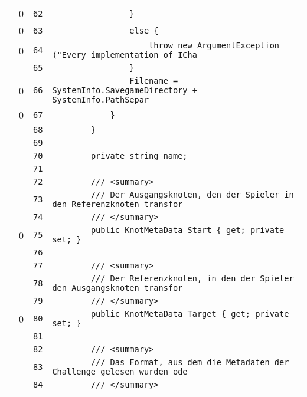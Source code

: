 \documentclass[a4paper,10pt]{article}
\begin{document}
\begin{longtable}[l]{lrrl}
\cellcolor{red} & 0 & \verb~62~ & \verb~                }~\\
\cellcolor{red} & 0 & \verb~63~ & \verb~                else {~\\
\cellcolor{red} & 0 & \verb~64~ & \verb~                    throw new ArgumentException ("Every implementation of ICha~\\
\cellcolor{gray} &  & \verb~65~ & \verb~                }~\\
\cellcolor{red} & 0 & \verb~66~ & \verb~                Filename = SystemInfo.SavegameDirectory + SystemInfo.PathSepar~\\
\cellcolor{red} & 0 & \verb~67~ & \verb~            }~\\
\cellcolor{gray} &  & \verb~68~ & \verb~        }~\\
\cellcolor{gray} &  & \verb~69~ & \verb~~\\
\cellcolor{gray} &  & \verb~70~ & \verb~        private string name;~\\
\cellcolor{gray} &  & \verb~71~ & \verb~~\\
\cellcolor{gray} &  & \verb~72~ & \verb~        /// <summary>~\\
\cellcolor{gray} &  & \verb~73~ & \verb~        /// Der Ausgangsknoten, den der Spieler in den Referenzknoten transfor~\\
\cellcolor{gray} &  & \verb~74~ & \verb~        /// </summary>~\\
\cellcolor{red} & 0 & \verb~75~ & \verb~        public KnotMetaData Start { get; private set; }~\\
\cellcolor{gray} &  & \verb~76~ & \verb~~\\
\cellcolor{gray} &  & \verb~77~ & \verb~        /// <summary>~\\
\cellcolor{gray} &  & \verb~78~ & \verb~        /// Der Referenzknoten, in den der Spieler den Ausgangsknoten transfor~\\
\cellcolor{gray} &  & \verb~79~ & \verb~        /// </summary>~\\
\cellcolor{red} & 0 & \verb~80~ & \verb~        public KnotMetaData Target { get; private set; }~\\
\cellcolor{gray} &  & \verb~81~ & \verb~~\\
\cellcolor{gray} &  & \verb~82~ & \verb~        /// <summary>~\\
\cellcolor{gray} &  & \verb~83~ & \verb~        /// Das Format, aus dem die Metadaten der Challenge gelesen wurden ode~\\
\cellcolor{gray} &  & \verb~84~ & \verb~        /// </summary>~\\

\end{longtable}
\end{document}
